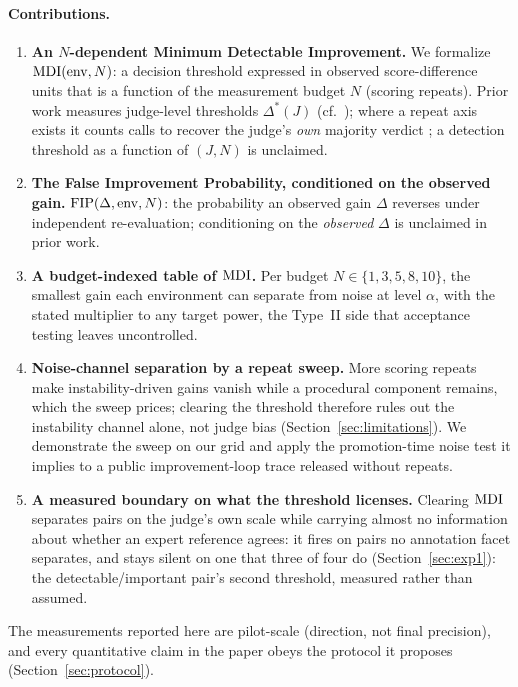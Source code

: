 \paragraph{Contributions.}
\begin{enumerate}
  \item \textbf{An $N$-dependent Minimum Detectable Improvement.} We
    formalize $\mathrm{MDI}(\mathrm{env}, N)$: a decision threshold expressed in observed
    score-difference units that is a function of the measurement budget $N$
    (scoring repeats). Prior work measures judge-level thresholds
    $\Delta^*(J)$ (cf.\ \citealp{usami2026darkcurrent}); where a repeat
    axis exists it counts calls to recover the judge's \emph{own} majority
    verdict \citep{yagubyan2026coinflip}; a detection threshold as a
    function of $(J, N)$ is unclaimed.
  \item \textbf{The False Improvement Probability, conditioned on the
    observed gain.} $\mathrm{FIP}(\Delta, \mathrm{env}, N)$: the probability an observed
    gain $\Delta$ reverses under independent re-evaluation; conditioning
    on the \emph{observed} $\Delta$ is unclaimed in prior work.
  \item \textbf{A budget-indexed table of $\mathrm{MDI}$.} Per budget
    $N \in \{1,3,5,8,10\}$, the smallest gain each environment can separate
    from noise at level $\alpha$, with the stated multiplier to any target
    power, the Type~II side that acceptance testing leaves uncontrolled.
  \item \textbf{Noise-channel separation by a repeat sweep.} More scoring
    repeats make instability-driven gains vanish while a procedural
    component remains, which the sweep prices; clearing the threshold
    therefore rules out the instability channel alone, not judge bias
    (Section~\ref{sec:limitations}). We demonstrate the sweep on our grid
    and apply the promotion-time noise test it implies to a public
    improvement-loop trace released without repeats.
  \item \textbf{A measured boundary on what the threshold licenses.}
    Clearing $\mathrm{MDI}$ separates pairs on the judge's own scale while carrying
    almost no information about whether an expert reference agrees: it fires
    on pairs no annotation facet separates, and stays silent on one that
    three of four do (Section~\ref{sec:exp1}): the detectable/important
    pair's second threshold, measured rather than assumed.
\end{enumerate}

The measurements reported here are pilot-scale (direction, not final
precision), and every quantitative claim in the paper obeys the protocol it
proposes (Section~\ref{sec:protocol}).
